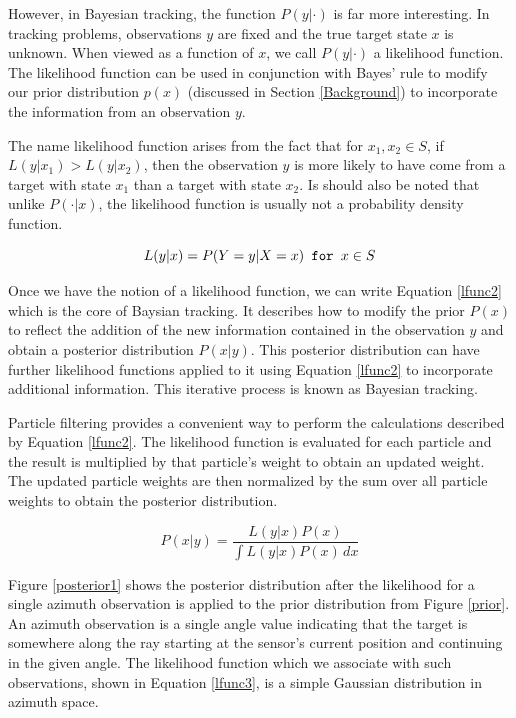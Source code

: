 \documentclass{article}
\begin{document}
However, in Bayesian tracking, the function \(P(y|\cdot)\) is far more interesting. In tracking problems, observations \(y\) are fixed and the true target state \(x\) is unknown. When viewed as a function of \(x\), we call \(P(y|\cdot)\) a likelihood function. The likelihood function can be used in conjunction with Bayes' rule to modify our prior distribution \(p(x)\) (discussed in Section \ref{Background}) to incorporate the information from an observation \(y\).

The name likelihood function arises from the fact that for \(x_{1},x_{2} \in S\), if \(L(y|x_{1})>L(y|x_{2})\), then the observation \(y\) is more likely to have come from a target with state \(x_{1}\) than a target with state \(x_{2}\). Is should also be noted that unlike \(P(\cdot|x)\), the likelihood function is usually not a probability density function.\cite{bmtt}

\begin{equation}\label{lfunc1}
L(y|x) = P( Y=y | X=x ) \verb! for ! x \in S
\end{equation}

Once we have the notion of a likelihood function, we can write Equation \ref{lfunc2} which is the core of Baysian tracking. It describes how to modify the prior \(P(x)\) to reflect the addition of the new information contained in the observation \(y\) and obtain a posterior distribution \(P(x|y)\). This posterior distribution can have further likelihood functions applied to it using Equation \ref{lfunc2} to incorporate additional information. This iterative process is known as Bayesian tracking.

Particle filtering provides a convenient way to perform the calculations described by Equation \ref{lfunc2}. The likelihood function is evaluated for each particle and the result is multiplied by that particle's weight to obtain an updated weight. The updated particle weights are then normalized by the sum over all particle weights to obtain the posterior distribution.

\begin{equation}\label{lfunc2}
P(x|y) = \frac{L(y|x)P(x)}{\int \! L(y|x)P(x) \, dx}
\end{equation}

Figure \ref{posterior1} shows the posterior distribution after the likelihood for a single azimuth observation is applied to the prior distribution from Figure \ref{prior}. An azimuth observation is a single angle value indicating that the target is somewhere along the ray starting at the sensor's current position and continuing in the given angle. The likelihood function which we associate with such observations, shown in Equation \ref{lfunc3}, is a simple Gaussian distribution in azimuth space.\cite{bmtt}
\end{document}
